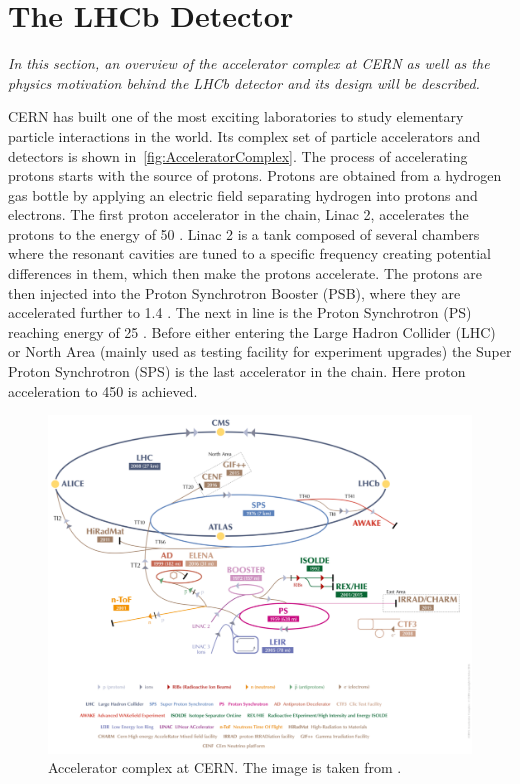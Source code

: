 \chapter{The LHCb Detector}
\label{chap:dec}

\textit{In this section, an overview of the accelerator complex at CERN as well as the physics motivation behind the \Gls{LHCb} detector and its design will be described.}

CERN has built one of the most exciting laboratories to study elementary particle interactions in the world. Its complex set of particle accelerators and detectors is shown in~\autoref{fig:AcceleratorComplex}. The process of accelerating protons starts with the source of protons. Protons are obtained from a hydrogen gas bottle by applying an electric field separating hydrogen into protons and electrons. The first proton accelerator in the chain, Linac 2, accelerates the protons to the energy of 50 \mev. Linac 2 is a tank composed of several chambers where the resonant cavities are tuned to a specific frequency creating potential differences in them, which then make the protons accelerate. The protons are then injected into the Proton Synchrotron Booster (\Gls{PSB}), where they are accelerated further to 1.4 \gev. The next in line is the Proton Synchrotron (\Gls{PS}) reaching \DIFaddbegin {}\DIFaddend energy of 25 \gev. Before either entering the Large Hadron Collider (\Gls{LHC}) or North Area (mainly used as testing facility for experiment upgrades) the Super Proton Synchrotron (\Gls{SPS}) is the last accelerator in the chain. Here proton acceleration to 450 \gev is achieved.

\begin{figure}
  \centering
  \includegraphics[width=1.0\linewidth]{figs/detector/AccComplexpng2pdf_cropped.pdf}
	\caption{Accelerator complex at CERN. The image is taken from \cite{complex}.}
  \label{fig:AcceleratorComplex}
\end{figure}

